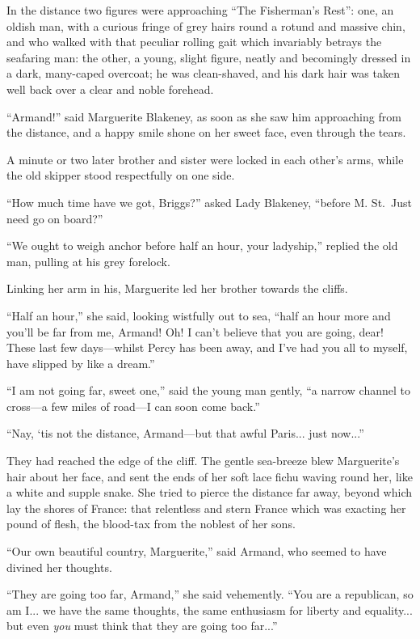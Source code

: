 \documentclass[paper=5.5in:8.5in,BCOR=7mm,twoside,DIV=calc,12pt,usegeometry,chapterprefix,endperiod,headings=big]{scrbook}
\begin{document}
In the distance two figures were approaching \enquote{The Fisherman's Rest}: one, an oldish man, with a curious fringe of grey hairs round a rotund and massive chin, and who walked with that peculiar rolling gait which invariably betrays the seafaring man: the other, a young, slight figure, neatly and becomingly dressed in a dark, many-caped overcoat; he was clean-shaved, and his dark hair was taken well back over a clear and noble forehead.

\enquote{Armand!} said Marguerite Blakeney, as soon as she saw him approaching from the distance, and a happy smile shone on her sweet face, even through the tears.

A minute or two later brother and sister were locked in each other's arms, while the old skipper stood respectfully on one side.

\enquote{How much time have we got, Briggs?} asked Lady Blakeney, \enquote{before M. St.~Just need go on board?}

\enquote{We ought to weigh anchor before half an hour, your ladyship,} replied the old man, pulling at his grey forelock.

Linking her arm in his, Marguerite led her brother towards the cliffs.

\enquote{Half an hour,} she said, looking wistfully out to sea, \enquote{half an hour more and you'll be far from me, Armand! Oh! I can't believe that you are going, dear! These last few days---whilst Percy has been away, and I've had you all to myself, have slipped by like a dream.}

\enquote{I am not going far, sweet one,} said the young man gently, \enquote{a narrow channel to cross---a few miles of road---I can soon come back.}

\enquote{Nay, `tis not the distance, Armand---but that awful Paris... just now...}

They had reached the edge of the cliff. The gentle sea-breeze blew Marguerite's hair about her face, and sent the ends of her soft lace fichu waving round her, like a white and supple snake. She tried to pierce the distance far away, beyond which lay the shores of France: that relentless and stern France which was exacting her pound of flesh, the blood-tax from the noblest of her sons.

\enquote{Our own beautiful country, Marguerite,} said Armand, who seemed to have divined her thoughts.

\enquote{They are going too far, Armand,} she said vehemently. \enquote{You are a republican, so am I... we have the same thoughts, the same enthusiasm for liberty and equality... but even \textit{you} must think that they are going too far...}
\end{document}
